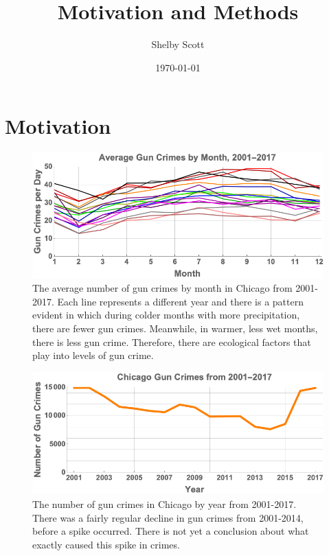 \documentclass{article}
\begin{document}
\title{Motivation and Methods}
\author{Shelby Scott}
\date{\today}
\maketitle

\section*{Motivation}
\begin{figure} [htbp] \centering
 \includegraphics[scale=0.5]{figures/AverageCrimeData.png}
 \caption{The average number of gun crimes by month in Chicago from 2001-2017. Each line represents a different year and there is a pattern evident in which during colder months with more precipitation, there are fewer gun crimes. Meanwhile, in warmer, less wet months, there is less gun crime. Therefore, there are ecological factors that play into levels of gun crime.}
\end{figure}

\begin{figure}[htbp] \centering
 \includegraphics[scale=0.60]{figures/YearlyCrimeData.png}
 \caption{The number of gun crimes in Chicago by year from 2001-2017. There was a fairly regular decline in gun crimes from 2001-2014, before a spike occurred. There is not yet a conclusion about what exactly caused this spike in crimes.}
\end{figure}
\end{document}
